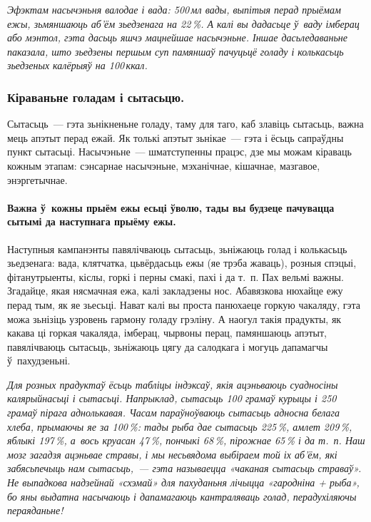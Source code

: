 
\emph{Эфэктам насычэньня валодае і вада: 500\,мл вады, выпітыя перад прыёмам ежы, зьмяншаюць аб'ём зьедзенага на 22\,\%. А калі вы дадасьце ў~ваду імберац або мэнтол, гэта дасьць яшчэ мацнейшае насычэньне. Іншае дасьледаваньне паказала, што зьедзены першым суп памяншаў пачуцьцё голаду і колькасьць зьедзеных калёрыяў на 100\,ккал.}

\subsubsection{Кіраваньне голадам і сытасьцю.}
Сытасьць~--- гэта зьнікненьне голаду, таму для таго, каб злавіць сытасьць, важна мець апэтыт перад ежай. Як толькі апэтыт зьнікае~--- гэта і ёсьць сапраўдны пункт сытасьці. Насычэньне~--- шматступенны працэс, дзе мы можам кіраваць кожным этапам: сэнсарнае насычэньне, мэханічнае, кішачнае, мазгавое, энэргетычнае.

\paragraph{Важна ў~кожны прыём ежы есьці ўволю, тады вы будзеце пачувацца сытымі да наступнага прыёму ежы.} Наступныя кампанэнты павялічваюць сытасьць, зьніжаюць голад і колькасьць зьедзенага: вада, клятчатка, цьвёрдасьць ежы (яе трэба жаваць), розныя спэцыі, фітанутрыенты, кіслы, горкі і перны смакі, пахі і да т.~п. Пах вельмі важны. Згадайце, якая нясмачная ежа, калі закладзены нос. Абавязкова нюхайце ежу перад тым, як яе зьесьці. Нават калі вы проста панюхаеце горкую чакаляду, гэта можа зьнізіць узровень гармону голаду грэліну. А наогул такія прадукты, як какава ці горкая чакаляда, імберац, чырвоны перац, памяншаюць апэтыт, павялічваюць сытасьць, зьніжаюць цягу да салодкага і могуць дапамагчы ў~пахудзеньні.

\emph{Для розных прадуктаў ёсьць табліцы індэксаў, якія ацэньваюць суадносіны калярыйнасьці і сытасьці. Напрыклад, сытасьць 100 грамаў курыцы і 250 грамаў пірага аднолькавая. Часам параўноўваюць сытасьць адносна белага хлеба, прымаючы яе за 100\,\%: тады рыба дае сытасьць 225\,\%, амлет 209\,\%, яблыкі 197\,\%, а~вось круасан 47\,\%, пончыкі 68\,\%, пірожнае 65\,\% і да т.~п. Наш мозг загадзя ацэньвае стравы, і мы несьвядома выбіраем той іх аб'ём, які забясьпечыць нам сытасьць,~--- гэта называецца «чаканая сытасьць страваў». Не выпадкова надзейнай «схэмай» для пахуданьня лічыцца «гародніна + рыба», бо яны выдатна насычаюць і дапамагаюць кантраляваць голад, перадухіляючы пераяданьне!}

